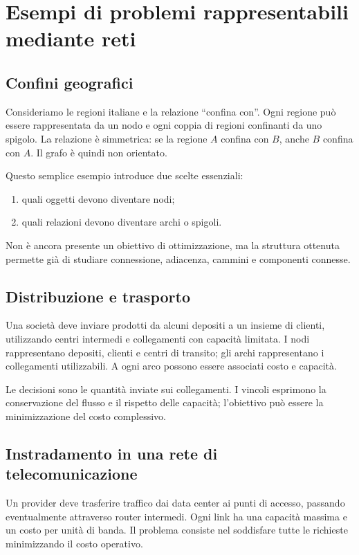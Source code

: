 \documentclass[11pt,a4paper]{article}
\begin{document}
\section{Esempi di problemi rappresentabili mediante reti}

\subsection{Confini geografici}

Consideriamo le regioni italiane e la relazione ``confina con''. Ogni regione può essere rappresentata da un nodo e ogni coppia di regioni confinanti da uno spigolo. La relazione è simmetrica: se la regione $A$ confina con $B$, anche $B$ confina con $A$. Il grafo è quindi non orientato.

Questo semplice esempio introduce due scelte essenziali:
\begin{enumerate}[label=(\alph*)]
\item quali oggetti devono diventare nodi;
\item quali relazioni devono diventare archi o spigoli.
\end{enumerate}
Non è ancora presente un obiettivo di ottimizzazione, ma la struttura ottenuta permette già di studiare connessione, adiacenza, cammini e componenti connesse.

\subsection{Distribuzione e trasporto}

Una società deve inviare prodotti da alcuni depositi a un insieme di clienti, utilizzando centri intermedi e collegamenti con capacità limitata. I nodi rappresentano depositi, clienti e centri di transito; gli archi rappresentano i collegamenti utilizzabili. A ogni arco possono essere associati costo e capacità.

Le decisioni sono le quantità inviate sui collegamenti. I vincoli esprimono la conservazione del flusso e il rispetto delle capacità; l'obiettivo può essere la minimizzazione del costo complessivo.

\subsection{Instradamento in una rete di telecomunicazione}

Un provider deve trasferire traffico dai data center ai punti di accesso, passando eventualmente attraverso router intermedi. Ogni link ha una capacità massima e un costo per unità di banda. Il problema consiste nel soddisfare tutte le richieste minimizzando il costo operativo.
\end{document}
